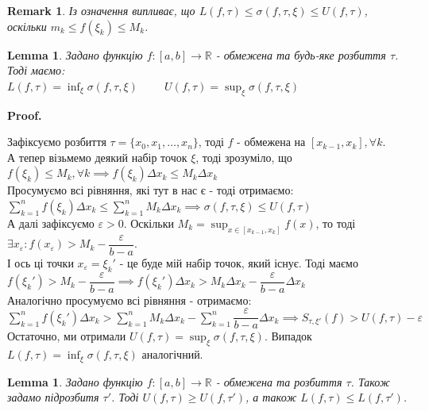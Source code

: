 \documentclass[a4paper, 10pt]{article}
\makeatletter
\def\huge{\displaystyle}
\def\qed{$\blacksquare$}
\theoremstyle{theoremdd}
\theoremstyle{theoremdd}
\theoremstyle{theoremdd}
\theoremstyle{theoremdd}
\theoremstyle{theoremdd}
\theoremstyle{theoremdd}
\theoremstyle{theoremdd}
\newtheorem{remark}[theorem]{Remark}
\theoremstyle{theoremdd}
\newtheorem{lemma}[theorem]{Lemma}
\theoremstyle{theoremdd}
\renewenvironment{proof}[1][Proof.\\]{\par
\pushQED{\hfill \qed}%
\normalfont \topsep6\p@\@plus6\p@\relax
\trivlist
\item\relax
{\bfseries
#1\@addpunct{.}}\hspace\labelsep\ignorespaces
}{%
\popQED\endtrivlist\@endpefalse
}
\makeatother
\begin{document}
\begin{remark}
Із означення випливає, що $L(f,\tau) \leq \sigma(f,\tau,\xi) \leq U(f,\tau)$, оскільки $m_k \leq f(\xi_k) \leq M_k$.
\end{remark}

\begin{lemma}
Задано функцію $f: [a,b] \to \mathbb{R}$ - обмежена та будь-яке розбиття $\tau$. Тоді маємо:\\
$L(f,\tau) = \huge\inf_{\xi} \sigma(f,\tau,\xi) \hspace{1cm} U(f,\tau) = \huge\sup_{\xi} \sigma(f,\tau,\xi)$
\end{lemma}

\begin{proof}
Зафіксуємо розбиття $\tau = \{x_0,x_1,\dots,x_n\}$, тоді $f$ - обмежена на $[x_{k-1},x_k], \forall k$.\\
А тепер візьмемо деякий набір точок $\xi$, тоді зрозуміло, що $f(\xi_k) \leq M_k, \forall k \implies f(\xi_k) \Delta x_k \leq M_k \Delta x_k$\\
Просумуємо всі рівняння, які тут в нас є - тоді отримаємо:\\
$\huge\sum_{k=1}^n f(\xi_k) \Delta x_k \leq \huge\sum_{k=1}^n M_k \Delta x_k \implies \sigma(f,\tau,\xi) \leq U(f, \tau)$
\bigskip \\
А далі зафіксуємо $\varepsilon > 0$. Оскільки $M_k = \huge\sup_{x \in [x_{k-1},x_k]} f(x)$, то тоді $\exists x_\varepsilon: f(x_\varepsilon) > M_k - \dfrac{\varepsilon}{b-a}$.\\
І ось ці точки $x_\varepsilon = \xi_k'$ - це буде мій набір точок, який існує. Тоді маємо\\
$f(\xi_k') > M_k - \dfrac{\varepsilon}{b-a} \implies f(\xi_k') \Delta x_k > M_k \Delta x_k - \dfrac{\varepsilon}{b-a} \Delta x_k$\\
Аналогічно просумуємо всі рівняння - отримаємо:\\
$\huge\sum_{k=1}^n f(\xi_k') \Delta x_k > \sum_{k=1}^n M_k \Delta x_k - \sum_{k=1}^n \dfrac{\varepsilon}{b-a} \Delta x_k \implies S_{\tau, \xi'}(f) > U(f,\tau) - \varepsilon$\\
Остаточно, ми отримали $U(f, \tau) = \huge\sup_\xi \sigma(f,\tau,\xi)$. Випадок $L(f,\tau) = \huge\inf_\xi \sigma(f,\tau,\xi)$ аналогічний.
\end{proof}

\begin{lemma}
Задано функцію $f: [a,b] \to \mathbb{R}$ - обмежена та розбиття $\tau$. Також задамо підрозбитя $\tau'$. Тоді $U(f,\tau) \geq U(f,\tau')$, а також  $L(f,\tau) \leq L(f,\tau')$.
\end{lemma}
\end{document}

